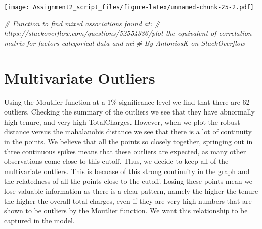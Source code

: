 \documentclass[
]{article}
\newenvironment{Shaded}{\begin{snugshade}}{\end{snugshade}}
\newcommand{\AttributeTok}[1]{\textcolor[rgb]{0.13,0.29,0.53}{#1}}
\newcommand{\CommentTok}[1]{\textcolor[rgb]{0.56,0.35,0.01}{\textit{#1}}}
\newcommand{\FloatTok}[1]{\textcolor[rgb]{0.00,0.00,0.81}{#1}}
\newcommand{\FunctionTok}[1]{\textcolor[rgb]{0.13,0.29,0.53}{\textbf{#1}}}
\newcommand{\NormalTok}[1]{#1}
\newcommand{\OtherTok}[1]{\textcolor[rgb]{0.56,0.35,0.01}{#1}}
\newcommand{\SpecialCharTok}[1]{\textcolor[rgb]{0.81,0.36,0.00}{\textbf{#1}}}
\begin{document}
\texttt{[image: Assignment2\_script\_files/figure-latex/unnamed-chunk-25-2.pdf]}

\begin{Shaded}
\begin{Highlighting}[]
\CommentTok{\# Function to find mixed associations found at:}
\CommentTok{\# https://stackoverflow.com/questions/52554336/plot{-}the{-}equivalent{-}of{-}correlation{-}matrix{-}for{-}factors{-}categorical{-}data{-}and{-}mi}
\CommentTok{\# By AntoniosK on StackOverflow}
\end{Highlighting}
\end{Shaded}

\hypertarget{multivariate-outliers}{%
\section{Multivariate Outliers}\label{multivariate-outliers}}

Using the Moutlier function at a 1\% significance level we find that
there are 62 outliers. Checking the summary of the outliers we see that
they have abnormally high tenure, and very high TotalCharges. However,
when we plot the robust distance versus the mahalanobis distance we see
that there is a lot of continuity in the points. We believe that all the
points so closely together, springing out in three continuous spikes
means that these outliers are expected, as many other observations come
close to this cutoff. Thus, we decide to keep all of the multivariate
outliers. This is becuase of this strong continuity in the graph and the
relatedness of all the points close to the cutoff. Losing these points
mean we lose valuable information as there is a clear pattern, namely
the higher the tenure the higher the overall total charges, even if they
are very high numbers that are shown to be outliers by the Moutlier
function. We want this relationship to be captured in the model.

\begin{Shaded}
\end{Shaded}
\end{document}
